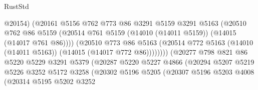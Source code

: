 \begin{lexlean}{RustStd}
\begin{coremodule}
                                      @20154)
                                    (@20161
                                      @5156
                                      @762
                                      @773
                                      @86
                                      @3291
                                      @5159
                                      @3291
                                      @5163
                                      (@20510
                                        @762
                                        @86
                                        @5159
                                        (@20514
                                          @761
                                          @5159
                                          (@14010 (@14011 @5159))
                                          (@14015 (@14017 @761 @86))))
                                      (@20510
                                        @773
                                        @86
                                        @5163
                                        (@20514
                                          @772
                                          @5163
                                          (@14010 (@14011 @5163))
                                          (@14015 (@14017 @772 @86))))))))
                              (@20277
                                @798
                                @821
                                @86
                                @5220
                                @5229
                                @3291
                                @5379
                                (@20287
                                  @5220
                                  @5227
                                  @4866
                                  (@20294
                                    @5207
                                    @5219
                                    @5226
                                    @3252
                                    @5172
                                    @3258
                                    (@20302
                                      @5196
                                      @5205
                                      (@20307
                                        @5196
                                        @5203
                                        @4008
                                        (@20314
                                          @5195
                                          @5202
                                          @3252

\end{coremodule}
\end{lexlean}
